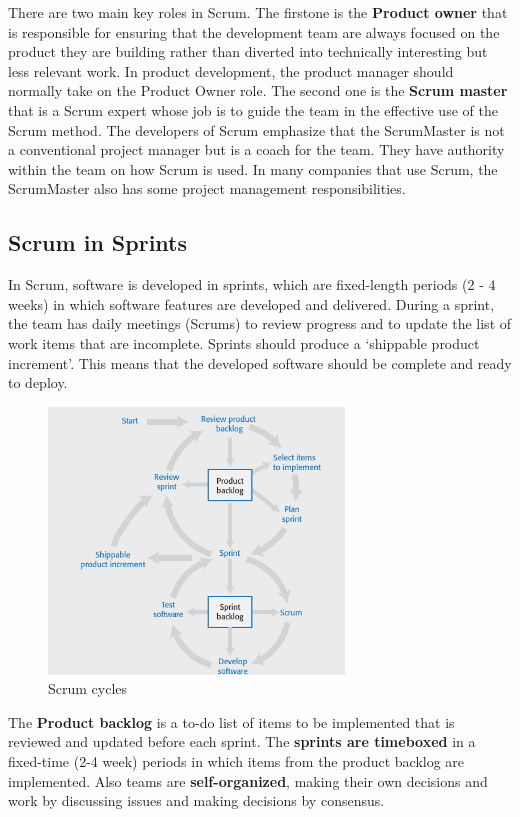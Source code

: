 \documentclass[10pt,a4paper]{report}
\begin{document}
There are two main key roles in Scrum. The firstone is the \textbf{Product owner} that is responsible for ensuring that the development
team are always focused on the product they are building rather than diverted into technically interesting but less relevant work. In product development, the product manager should normally take on the Product Owner role.
The second one is the \textbf{Scrum master} that is a Scrum expert whose job is to guide the team in the effective use of the Scrum method. The developers of Scrum emphasize that the ScrumMaster is not a conventional project manager
but is a coach for the team. They have authority within the team on how Scrum is used.
In many companies that use Scrum, the ScrumMaster also has some project management responsibilities.

\subsection{Scrum in Sprints}
In Scrum, software is developed in sprints, which are fixed-length periods (2 - 4 weeks) in which software features are developed and
delivered. During a sprint, the team has daily meetings (Scrums) to review progress
and to update the list of work items that are incomplete. Sprints should produce a ‘shippable product increment’. This means that the developed software should be complete and ready to deploy.

\begin{figure}[h]
	\centering
	\includegraphics[width=0.7\textwidth]{image09}
	\caption{Scrum cycles}
	\label{image09}
\end{figure}

The \textbf{Product backlog} is a to-do list of items to be implemented that is reviewed and
updated before each sprint. The \textbf{sprints are timeboxed} in a fixed-time (2-4 week) periods in which items from the product backlog are implemented. Also teams are \textbf{self-organized}, making their own decisions and work by discussing issues and making decisions by consensus.
\end{document}
